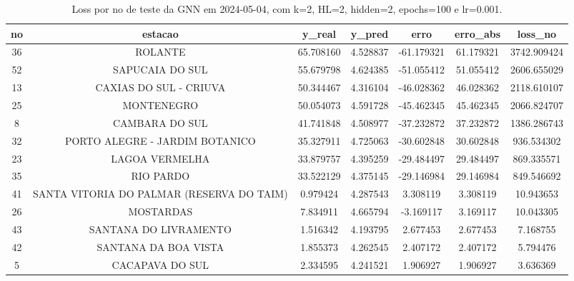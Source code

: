 \begin{table}[h]
\centering
\caption{Loss por no de teste da GNN em 2024-05-04, com k=2, HL=2, hidden=2, epochs=100 e lr=0.001.}
\label{tab:gnn_loss_k2_hl2_h2_e100_d20240504}
\begin{tabular}{ccccccc}
\toprule
no & estacao & y\_real & y\_pred & erro & erro\_abs & loss\_no \\
\midrule
36 & ROLANTE & 65.708160 & 4.528837 & -61.179321 & 61.179321 & 3742.909424 \\
52 & SAPUCAIA DO SUL & 55.679798 & 4.624385 & -51.055412 & 51.055412 & 2606.655029 \\
13 & CAXIAS DO SUL - CRIUVA & 50.344467 & 4.316104 & -46.028362 & 46.028362 & 2118.610107 \\
25 & MONTENEGRO & 50.054073 & 4.591728 & -45.462345 & 45.462345 & 2066.824707 \\
8 & CAMBARA DO SUL & 41.741848 & 4.508977 & -37.232872 & 37.232872 & 1386.286743 \\
32 & PORTO ALEGRE - JARDIM BOTANICO & 35.327911 & 4.725063 & -30.602848 & 30.602848 & 936.534302 \\
23 & LAGOA VERMELHA & 33.879757 & 4.395259 & -29.484497 & 29.484497 & 869.335571 \\
35 & RIO PARDO & 33.522129 & 4.375145 & -29.146984 & 29.146984 & 849.546692 \\
41 & SANTA VITORIA DO PALMAR (RESERVA DO TAIM) & 0.979424 & 4.287543 & 3.308119 & 3.308119 & 10.943653 \\
26 & MOSTARDAS & 7.834911 & 4.665794 & -3.169117 & 3.169117 & 10.043305 \\
43 & SANTANA DO LIVRAMENTO & 1.516342 & 4.193795 & 2.677453 & 2.677453 & 7.168755 \\
42 & SANTANA DA BOA VISTA & 1.855373 & 4.262545 & 2.407172 & 2.407172 & 5.794476 \\
5 & CACAPAVA DO SUL & 2.334595 & 4.241521 & 1.906927 & 1.906927 & 3.636369 \\
\bottomrule
\end{tabular}
\end{table}
